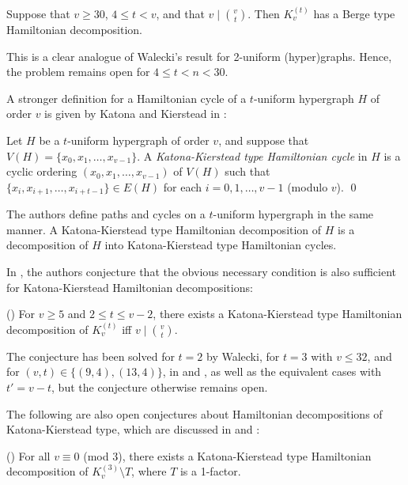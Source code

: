 \begin{theorem} \label{berge-hamilton2}
Suppose that $v \geq 30$, $4 \leq t < v$, and that $v \mid {v \choose t}$. Then
$K_v^{(t)}$ has a Berge type Hamiltonian decomposition.
\end{theorem}

This is a clear analogue of Walecki's result for 2-uniform (hyper)graphs.
Hence, the problem remains open for $4 \leq t < n < 30$.

A stronger definition for a Hamiltonian cycle of a $t$-uniform hypergraph $H$ of
order $v$ is given by Katona and Kierstead in \cite{kato-kier}:

\begin{definition}
Let $H$ be a $t$-uniform hypergraph of order $v$, and suppose that $V(H) =
\{x_0, x_1, \ldots, x_{v-1}\}$.
A {\em Katona-Kierstead type Hamiltonian cycle} in $H$ is a cyclic ordering
$(x_0, x_1, \ldots, x_{v-1})$ of $V(H)$
such that $\{x_i, x_{i+1}, \ldots, x_{i+t-1}\} \in E(H)$ for each $i =
0,1,\ldots,v-1$ (modulo $v$).
\qed
\end{definition}

The authors define paths and cycles on a $t$-uniform hypergraph in the same
manner.
A Katona-Kierstead type Hamiltonian decomposition of $H$ is a decomposition of
$H$ into Katona-Kierstead type Hamiltonian cycles.

In \cite{bail-stev}, the authors conjecture that the obvious necessary
condition is also sufficient for Katona-Kierstead Hamiltonian decompositions:

\begin{conjecture} \label{bailey-stevens} (\cite{bail-stev})
For $v \geq 5$ and $2 \leq t \leq v-2$, there exists a Katona-Kierstead type
Hamiltonian decomposition of $K_{v}^{(t)}$ iff $v \mid {v \choose t}$.
\end{conjecture}

The conjecture has been solved for $t = 2$ by Walecki, for $t=3$ with $v \leq
32$, and for $(v, t) \in \{(9,4),(13,4)\}$, in \cite{bail-stev} and
\cite{mesz-rosa}, as well as the equivalent cases with $t' = v-t$, but
the conjecture otherwise remains open.

The following are also open conjectures about Hamiltonian decompositions of
Katona-Kierstead type, which are discussed in \cite{mesz-rosa} and
\cite{kuhl-schr}:

\begin{conjecture} (\cite{mesz-rosa})
For all $v \equiv 0$ (mod $3$), there exists a Katona-Kierstead type
Hamiltonian decomposition of $K_v^{(3)} \setminus T$, where $T$ is a 1-factor.
\end{conjecture}

